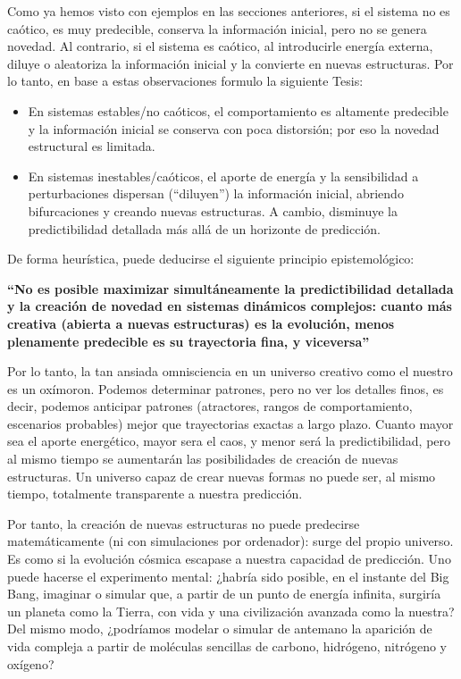 \documentclass[
  10pt,
  a4paper,
  DIV=11,
  numbers=noendperiod,
  open=any]{scrreprt}
\numberwithin{equation}{chapter}
\numberwithin{equation}{section}
\renewcommand{\[}{\begin{equation}}
\renewcommand{\]}{\end{equation}}
\begin{document}
Como ya hemos visto con ejemplos en las secciones anteriores, si el
sistema no es caótico, es muy predecible, conserva la información
inicial, pero no se genera novedad. Al contrario, si el sistema es
caótico, al introducirle energía externa, diluye o aleatoriza la
información inicial y la convierte en nuevas estructuras. Por lo tanto,
en base a estas observaciones formulo la siguiente Tesis:

\begin{itemize}
\item
  En sistemas estables/no caóticos, el comportamiento es altamente
  predecible y la información inicial se conserva con poca distorsión;
  por eso la novedad estructural es limitada.
\item
  En sistemas inestables/caóticos, el aporte de energía y la
  sensibilidad a perturbaciones dispersan (``diluyen'') la información
  inicial, abriendo bifurcaciones y creando nuevas estructuras. A
  cambio, disminuye la predictibilidad detallada más allá de un
  horizonte de predicción.
\end{itemize}

De forma heurística, puede deducirse el siguiente principio epistemológico:

\textbf{``No es posible maximizar simultáneamente la predictibilidad
detallada y la creación de novedad en sistemas dinámicos complejos:
cuanto más creativa (abierta a nuevas estructuras) es la evolución,
menos plenamente predecible es su trayectoria fina, y viceversa''}

Por lo tanto, la tan ansiada omnisciencia en un universo creativo como
el nuestro es un oxímoron. Podemos determinar patrones, pero no ver los
detalles finos, es decir, podemos anticipar patrones (atractores, rangos
de comportamiento, escenarios probables) mejor que trayectorias exactas
a largo plazo. Cuanto mayor sea el aporte energético, mayor sera el
caos, y menor será la predictibilidad, pero al mismo tiempo se
aumentarán las posibilidades de creación de nuevas estructuras. Un
universo capaz de crear nuevas formas no puede ser, al mismo tiempo,
totalmente transparente a nuestra predicción.

Por tanto, la creación de nuevas estructuras no puede predecirse
matemáticamente (ni con simulaciones por ordenador): surge del propio
universo. Es como si la evolución cósmica escapase a nuestra capacidad
de predicción. Uno puede hacerse el experimento mental: ¿habría sido
posible, en el instante del Big Bang, imaginar o simular que, a partir
de un punto de energía infinita, surgiría un planeta como la Tierra, con
vida y una civilización avanzada como la nuestra? Del mismo modo,
¿podríamos modelar o simular de antemano la aparición de vida compleja a
partir de moléculas sencillas de carbono, hidrógeno, nitrógeno y
oxígeno?
\end{document}
